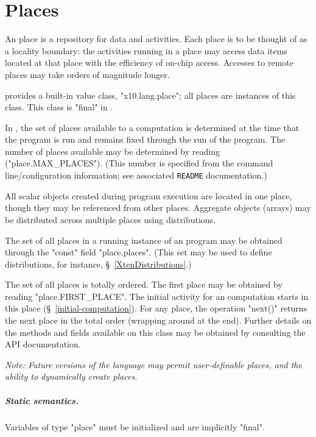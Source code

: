 \chapter{Places}\label{XtenPlaces}

An \Xten{} place is a repository for data and activities. Each place
is to be thought of as a locality boundary: the activities running in
a place may access data items located at that place with the
efficiency of on-chip access. Accesses to remote places may take
orders of magnitude longer.

{}\Xten{} provides a built-in value class, \xcd"x10.lang.place"; all
places are instances of this class.  This class is \xcd"final" in
{}\XtenCurrVer.

In \XtenCurrVer{}, the set of places available to a computation is
determined at the time that the program is run and remains fixed
through the run of the program. The number of places available 
may be determined by reading (\xcd"place.MAX_PLACES"). (This number
is specified from the command line/configuration information; 
see associated {\tt README} documentation.)

All scalar objects created during program execution are located in one
place, though they may be referenced from other places. Aggregate
objects (arrays) may be distributed across multiple places using
distributions.

The set of all places in a running instance of an \Xten{} program may
be obtained through the \xcd"const" field \xcd"place.places".  (This
set may be used to define distributions, for instance,
\S~\ref{XtenDistributions}.) 


The set of all places is totally ordered.  The first place may be
obtained by reading \xcd"place.FIRST_PLACE". The initial activity for
an \Xten{} computation starts in this place
(\S~\ref{initial-computation}). For any place, the operation \xcd"next()"
returns the next place in the total order (wrapping around at the
end). Further details on the methods and fields available on this
class may be obtained by consulting the API documentation.

{\em Note: Future versions of the language may permit user-definable
places, and the ability to dynamically create places. }

\paragraph{Static semantics.}
Variables of type \xcd"place" must be initialized and are implicitly
\xcd"final".  

